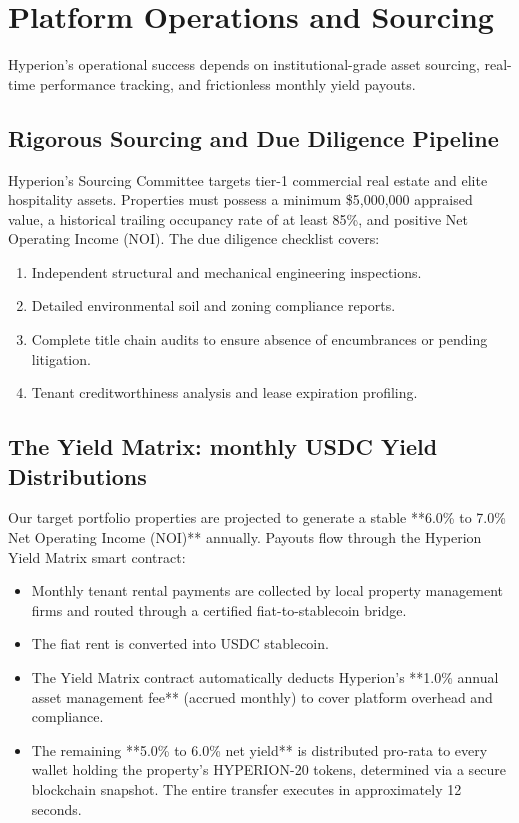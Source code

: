 \documentclass[11pt]{article}
\begin{document}
\section{Platform Operations and Sourcing}
Hyperion's operational success depends on institutional-grade asset sourcing, real-time performance tracking, and frictionless monthly yield payouts.

\subsection{Rigorous Sourcing and Due Diligence Pipeline}
Hyperion's Sourcing Committee targets tier-1 commercial real estate and elite hospitality assets. Properties must possess a minimum \$5,000,000 appraised value, a historical trailing occupancy rate of at least 85\%, and positive Net Operating Income (NOI). The due diligence checklist covers:
\begin{enumerate}
    \item Independent structural and mechanical engineering inspections.
    \item Detailed environmental soil and zoning compliance reports.
    \item Complete title chain audits to ensure absence of encumbrances or pending litigation.
    \item Tenant creditworthiness analysis and lease expiration profiling.
\end{enumerate}

\subsection{The Yield Matrix: monthly USDC Yield Distributions}
Our target portfolio properties are projected to generate a stable **6.0\% to 7.0\% Net Operating Income (NOI)** annually. Payouts flow through the Hyperion Yield Matrix smart contract:
\begin{itemize}
    \item Monthly tenant rental payments are collected by local property management firms and routed through a certified fiat-to-stablecoin bridge.
    \item The fiat rent is converted into USDC stablecoin.
    \item The Yield Matrix contract automatically deducts Hyperion's **1.0\% annual asset management fee** (accrued monthly) to cover platform overhead and compliance.
    \item The remaining **5.0\% to 6.0\% net yield** is distributed pro-rata to every wallet holding the property's HYPERION-20 tokens, determined via a secure blockchain snapshot. The entire transfer executes in approximately 12 seconds.
\end{itemize}
\end{document}
